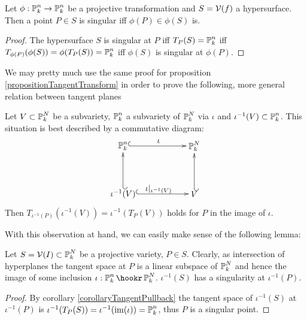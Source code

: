 \begin{corollary}
Let $\phi : \operatorname{\mathbb P}^n_k \to \operatorname{\mathbb P}^n_k$ be a projective transformation and $S = \operatorname{\mathcal V}(f)$ a hypersurface.
Then a point $P \in S$ is singular iff $\phi(P) \in \phi(S)$ is.
\end{corollary}
\begin{proof}
The hypersurface $S$ is singular at $P$ iff $T_P(S) = \operatorname{\mathbb P}^n_k$ iff $T_{\phi(P)}(\phi(S)) = \phi(T_P(S)) = \operatorname{\mathbb P}^n_k$ iff $\phi(S)$ is singular at $\phi(P)$.
\end{proof}

We may pretty much use the same proof for proposition \ref{propositionTangentTransform} in order to prove the following, more general relation between tangent planes
\begin{corollary} \label{corollaryTangentPullback}
Let $V\subset \operatorname{\mathbb P}^N_k$ be a subvariety, $\operatorname{\mathbb P}^n_k$ a subvariety of $\operatorname{\mathbb P}^N_k$ via $\iota$ and $\iota^{-1}(V) \subset \operatorname{\mathbb P}^n_k$. This situation is best described by a commutative diagram:
\begin{equation}
\begin{xy}
(0,20)*+{\proj^n_k}="pn";
(30,20)*+{\proj^N_k}="pN";
(0,0)*+{\iota^{-1}(V)}="iv";
(30,0)*+{V}="v";
{\ar@{^{(}->} "pn";"pN"}?*!/_2mm/{\iota};
{\ar@{^{(}->} "iv";"v"}?*!/_2mm/{\iota|_{\iota^{-1}(V)}};
{\ar@{_{(}->} "iv";"pn"};
{\ar@{_{(}->} "v";"pN"};
\end{xy}
\end{equation}
Then $T_{\iota^{-1}(P)}(\iota^{-1}(V)) = \iota^{-1}(T_P(V)) $ holds for $P$ in the image of $\iota$.
\end{corollary}

With this observation at hand, we can easily make sense of the following lemma:

\begin{lemma} \label{lemmaIntersectionWithTangent}
Let $S = \operatorname{\mathcal V}(I) \subset \operatorname{\mathbb P}^N_k$ be a projective variety, $P\in S$.
Clearly, as intersection of hyperplanes the tangent space at $P$ is a linear subspace of $\operatorname{\mathbb P}^N_k$ and hence the image of some inclusion $\iota : \proj^n_k \hookr \proj^N_k$.
$\iota^{-1}(S)$ has a singularity at $\iota^{-1}(P)$.
\end{lemma}
\begin{proof}
By corollary \ref{corollaryTangentPullback} the tangent space of $\iota^{-1}(S)$ at $\iota^{-1}(P)$ is $\iota^{-1}(T_P(S)) = \iota^{-1}({\operatorname{im}}(\iota)) = \operatorname{\mathbb P}^n_k$, thus $P$ is a singular point.
\end{proof}
